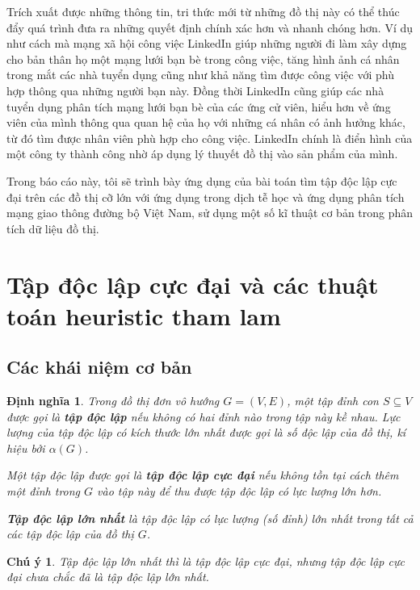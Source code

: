 \documentclass[14pt, oneside, a4paper, openany]{scrartcl}
\newtheorem*{remark}{Chú ý}
\newtheorem{definition}{Định nghĩa}[section]
\begin{document}
Trích xuất được những thông tin, tri thức mới từ những đồ thị này có thể thúc đẩy quá trình đưa ra những quyết định chính xác hơn và nhanh chóng hơn. 
Ví dụ như cách mà mạng xã hội công việc LinkedIn giúp những người đi làm xây dựng cho bản thân họ một mạng lưới bạn bè trong công việc, tăng hình ảnh cá nhân trong mắt các nhà tuyển dụng cũng như khả năng tìm được công việc với phù hợp thông qua những người bạn này. Đồng thời LinkedIn cũng giúp các nhà tuyển dụng phân tích mạng lưới bạn bè của các ứng cử viên, hiểu hơn về ứng viên của mình thông qua quan hệ của họ với những cá nhân có ảnh hưởng khác, từ đó tìm được nhân viên phù hợp cho công việc. LinkedIn chính là điển hình của một công ty thành công nhờ áp dụng lý thuyết đồ thị vào sản phẩm của mình.

Trong báo cáo này, tôi sẽ trình bày ứng dụng của bài toán tìm tập độc lập cực đại trên các đồ thị cỡ lớn với ứng dụng trong dịch tễ học và ứng dụng phân tích mạng giao thông đường bộ Việt Nam, sử dụng một số kĩ thuật cơ bản trong phân tích dữ liệu đồ thị.

\newpage
\section{Tập độc lập cực đại và các thuật toán heuristic tham lam}
\subsection{Các khái niệm cơ bản}
\begin{definition}
\cite{graphtextbook} Trong đồ thị đơn vô hướng $G = (V,E)$, một tập đỉnh con $S \subseteq V$ được gọi là \textbf{tập độc lập}  nếu không có hai đỉnh nào trong tập này kề nhau. Lực lượng của tập độc lập có kích thước lớn nhất được gọi là số độc lập của đồ thị, kí hiệu bởi $\alpha(G)$.	

Một tập độc lập được gọi là \textbf{tập độc lập cực đại}  nếu không tồn tại cách thêm một đỉnh trong $G$ vào tập này để thu được tập độc lập có lực lượng lớn hơn.

\textbf{Tập độc lập lớn nhất}  là tập độc lập có lực lượng (số đỉnh) lớn nhất trong tất cả các tập độc lập của đồ thị $G$.

\end{definition}
\begin{remark}
Tập độc lập lớn nhất thì là tập độc lập cực đại, nhưng tập độc lập cực đại chưa chắc đã là tập độc lập lớn nhất.	
\end{remark}
\end{document}
